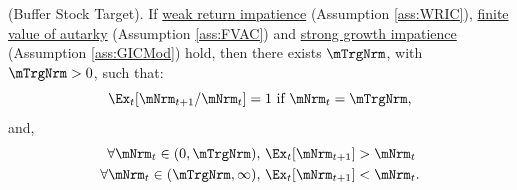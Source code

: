   \begin{theorem}\label{thm:target} (Buffer Stock Target).
If \hyperlink{WRIC}{weak return impatience} (Assumption \ref{ass:WRIC}), \hyperlink{FVAC}{finite value of autarky} (Assumption \ref{ass:FVAC}) and \hyperlink{GICMod}{strong growth impatience} (Assumption \ref{ass:GICMod}) hold, then there exists $\mTrgNrm$, with $\mTrgNrm>0$, such that:
    \begin{equation}
      \Ex_t [{\mNrm}_{t+1}/\mNrm_t] = 1 \mbox{~if~} \mNrm_t = \mTrgNrm,
      \label{eq:mTarget} %
    \end{equation}
    and,
    \begin{equation}
      \label{eq:stability} %
      \begin{aligned}
        \forall {\mNrm}_t\in(0,\mTrgNrm),      \,\,& \Ex_t [{\mNrm}_{t+1}] > {\mNrm}_t  \\
        \forall {\mNrm}_t\in(\mTrgNrm,\infty), \,\,& \Ex_t [{\mNrm}_{t+1}] < {\mNrm}_t.
      \end{aligned}
    \end{equation}
  \end{theorem}
